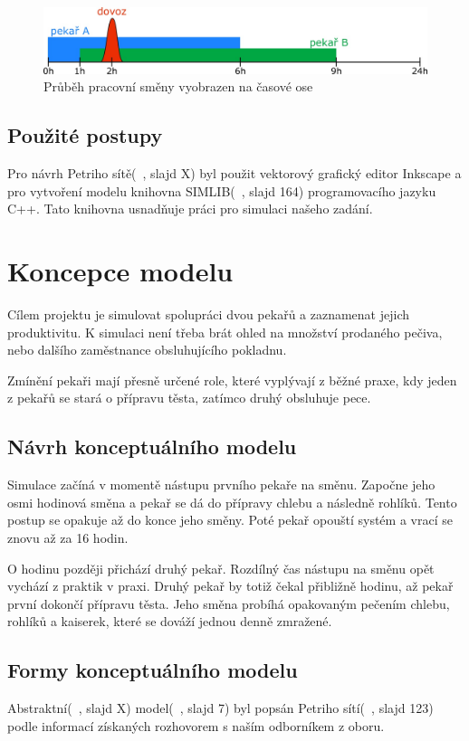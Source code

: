 \documentclass[11pt]{article}
\begin{document}
\begin{figure}[H]
  \includegraphics[width=\linewidth]{timeline.jpg}
  \caption{Průběh pracovní směny vyobrazen na časové ose}
  \label{fig:timeline}
\end{figure}

\subsection{Použité postupy}
Pro návrh Petriho sítě(~\cite{prezentace}, slajd X) byl použit vektorový grafický editor Inkscape a pro vytvoření modelu knihovna SIMLIB(~\cite{prezentace}, slajd 164) programovacího jazyku C++. Tato knihovna usnadňuje práci pro simulaci našeho zadání. 

\section{Koncepce modelu}
Cílem projektu je simulovat spolupráci dvou pekařů a zaznamenat jejich produktivitu. K simulaci není třeba brát ohled na množství prodaného pečiva, nebo dalšího zaměstnance obsluhujícího pokladnu. 

Zmínění pekaři mají přesně určené role, které vyplývají z běžné praxe, kdy jeden z pekařů se stará o přípravu těsta, zatímco druhý obsluhuje pece.

\subsection{Návrh konceptuálního modelu}
Simulace začíná v momentě nástupu prvního pekaře na směnu. Započne jeho osmi hodinová směna a pekař se dá do přípravy chlebu a následně rohlíků. Tento postup se opakuje až do konce jeho směny. Poté pekař opouští systém a vrací se znovu až za 16 hodin.

O hodinu později přichází druhý pekař. Rozdílný čas nástupu na směnu opět vychází z praktik v praxi. Druhý pekař by totiž čekal přibližně hodinu, až pekař první dokončí přípravu těsta. Jeho směna probíhá opakovaným pečením chlebu, rohlíků a kaiserek, které se dováží jednou denně zmražené. 

\subsection{Formy konceptuálního modelu}
Abstraktní(~\cite{prezentace}, slajd X) model(~\cite{prezentace}, slajd 7) byl popsán Petriho sítí(~\cite{prezentace}, slajd 123) podle informací získaných rozhovorem s naším odborníkem z oboru. 
\end{document}
